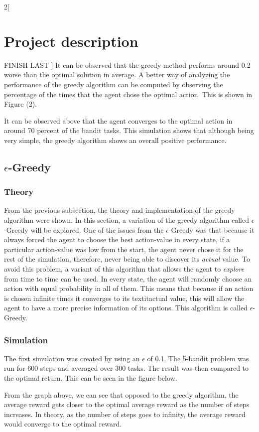 \documentclass[a4paper]{article}
\begin{document}
\begin{multicols}{2}[
		\section*{Project description}
		FINISH LAST
		]
		It can be observed that the greedy method performs around 0.2 worse than the optimal solution in average. A better way of analyzing the performance of the greedy algorithm can be computed by observing the percentage of the times that the agent chose the optimal action. This is shown in Figure (2).

		
		It can be observed above that the agent converges to the optimal action in around 70 percent of the bandit tasks. This simulation shows that although being very simple, the greedy algorithm shows an overall positive performance.
		
		\subsection{$\epsilon$-Greedy}
		\subsubsection{Theory}
		From the previous subsection, the theory and implementation of the greedy algorithm were shown. In this section, a variation of the greedy algorithm called $\epsilon$-Greedy will be explored. One of the issues from the $\epsilon$-Greedy was that because it always forced the agent to choose the best action-value in every state, if a particular action-value was low from the start, the agent never chose it for the rest of the simulation, therefore, never being able to discover its \textit{actual} value. To avoid this problem, a variant of this algorithm that allows the agent to \textit{explore} from time to time can be used. In every state, the agent will randomly choose an action with equal probability in all of them. This means that because if an action is chosen infinite times it converges to its textit{actual} value, this will allow the agent to have a more precise information of its options. This algorithm is called $\epsilon$-Greedy.
		
		\subsubsection{Simulation}
		The first simulation was created by using an $\epsilon$ of 0.1. The 5-bandit problem was run for 600 steps and averaged over 300 tasks. The result was then compared to the optimal return. This can be seen in the figure below.

		
		From the graph above, we can see that opposed to the greedy algorithm, the average reward gets closer to the optimal average reward as the number of steps increases. In theory, as the number of steps goes to infinity, the average reward would converge to the optimal reward. \\
		

\end{multicols}
\end{document}
